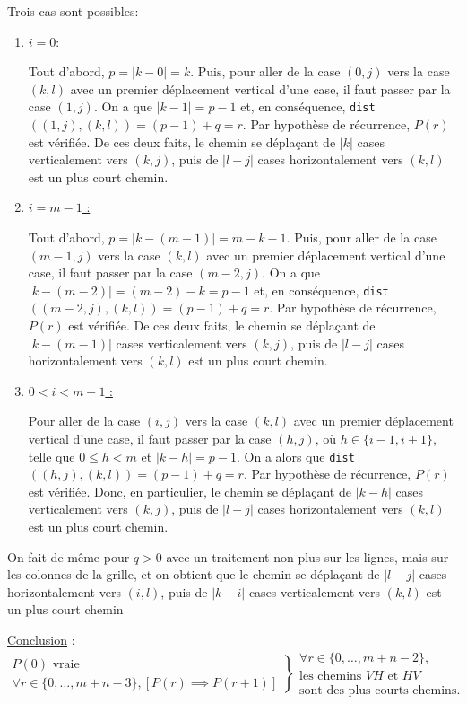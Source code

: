 \documentclass[12pt,a4paper]{article}
\begin{document}
Trois cas sont possibles:
\begin{enumerate}
  \item \underline{$i=0$:} 
  
  Tout d'abord, $p=|k-0|=k$. Puis, pour aller de la case $(0,j)$ vers la case 
  $(k,l)$ avec un premier   d\'eplacement vertical d'une case, il faut passer 
  par 
  la case $(1,j)$. On a que $|k-1|=p-1$ et, en 
  cons\'equence, \texttt{dist}$((1,j),(k,l))=(p-1)+q=r$. Par 
  hypoth\`ese de r\'ecurrence, $P(r)$ est v\'erifi\'ee. De ces deux faits, le 
  chemin se d\'epla\c{c}ant de $|k|$ cases verticalement vers $(k,j)$, puis de 
  $|l-j|$ cases horizontalement vers $(k,l)$ est un plus court chemin.
  \item \underline{$i=m-1$ :} 
  
  Tout d'abord, $p=|k-(m-1)|=m-k-1$. Puis, pour aller de la case $(m-1,j)$ vers 
  la case $(k,l)$ avec un premier d\'eplacement vertical d'une case, il faut 
  passer par la case $(m-2,j)$. On a que $|k-(m-2)|=(m-2)-k=p-1$ et, en 
  cons\'equence, \texttt{dist}$((m-2,j),(k,l))=(p-1)+q=r$. Par hypoth\`ese de 
  r\'ecurrence, $P(r)$ est v\'erifi\'ee. De ces deux faits, le chemin se 
  d\'epla\c{c}ant de $|k-(m-1)|$ cases verticalement vers $(k,j)$, puis de 
  $|l-j|$ cases horizontalement vers $(k,l)$ est un plus court chemin.
  \item \underline{$0 < i <  m-1$ :}
  
  Pour aller de la case $(i,j)$ vers la case $(k,l)$ avec un premier 
  d\'eplacement vertical d'une case, il faut passer par la case $(h,j)$, 
  o\`u $h \in \{i-1, i+1\}$, telle que $0 \leq h < m$ et $|k-h|=p-1$. On a 
  alors 
  que \texttt{dist}$((h,j),(k,l))=(p-1)+q=r$. Par hypoth\`ese de 
  r\'ecurrence, $P(r)$ est v\'erifi\'ee. Donc, en particulier, le chemin se 
  d\'epla\c{c}ant de $|k-h|$ cases verticalement vers $(k,j)$, puis de $|l-j|$ 
  cases horizontalement vers $(k,l)$ est un plus court chemin.
\end{enumerate}
On fait de m\^eme pour $q>0$ avec un traitement non plus sur les lignes, mais 
sur les colonnes de la grille, et on obtient que le chemin se d\'epla\c{c}ant 
de 
$|l-j|$ cases horizontalement vers $(i,l)$, puis de $|k-i|$ cases verticalement 
vers $(k,l)$ est un plus court chemin

\medskip
\underline{Conclusion} : 
\begin{equation*}
  \left .\begin{array}{l}
	P(0) \text{ vraie } \\
	\forall r \in \{0,\dotsc, m+n-3\}, [ P(r) \implies P(r+1) 
	]
  \end{array} \right \}
  \left .\begin{array}{l}
	\forall r \in \{0,\dotsc, m+n-2\}, \\
	\text{les chemins } VH \text{ et } HV\\
	\text{sont des plus courts chemins.}
  \end{array}\right .
\end{equation*}
\end{document}
